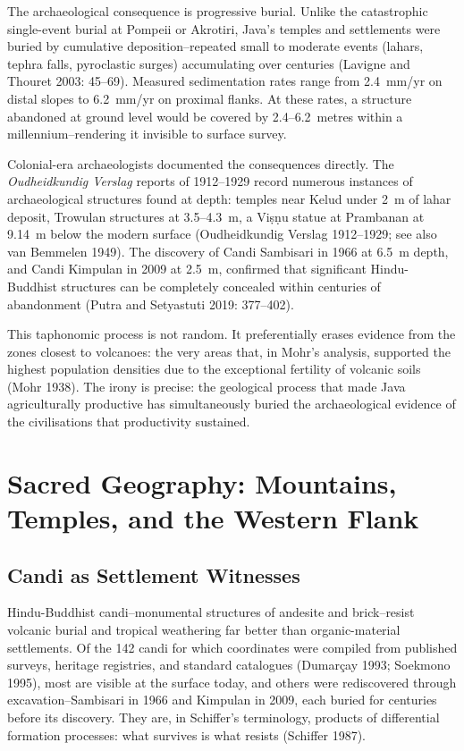\documentclass[12pt,a4paper]{article}
\begin{document}
The archaeological consequence is progressive burial.
Unlike the catastrophic single-event burial at Pompeii or Akrotiri, Java's temples and settlements were buried by cumulative deposition--repeated small to moderate events (lahars, tephra falls, pyroclastic surges) accumulating over centuries (Lavigne and Thouret 2003: 45--69).
Measured sedimentation rates range from 2.4~mm/yr on distal slopes to 6.2~mm/yr on proximal flanks.
At these rates, a structure abandoned at ground level would be covered by 2.4--6.2~metres within a millennium--rendering it invisible to surface survey.

Colonial-era archaeologists documented the consequences directly.
The \emph{Oudheidkundig Verslag} reports of 1912--1929 record numerous instances of archaeological structures found at depth: temples near Kelud under 2~m of lahar deposit, Trowulan structures at 3.5--4.3~m, a Vi\d{s}\d{n}u statue at Prambanan at 9.14~m below the modern surface (Oudheidkundig Verslag 1912--1929; see also van Bemmelen 1949).
The discovery of Candi Sambisari in 1966 at 6.5~m depth, and Candi Kimpulan in 2009 at 2.5~m, confirmed that significant Hindu-Buddhist structures can be completely concealed within centuries of abandonment (Putra and Setyastuti 2019: 377--402).

This taphonomic process is not random.
It preferentially erases evidence from the zones closest to volcanoes: the very areas that, in Mohr's analysis, supported the highest population densities due to the exceptional fertility of volcanic soils (Mohr 1938).
The irony is precise: the geological process that made Java agriculturally productive has simultaneously buried the archaeological evidence of the civilisations that productivity sustained.


\section{Sacred Geography: Mountains, Temples, and the Western Flank}

\subsection{Candi as Settlement Witnesses}

Hindu-Buddhist candi--monumental structures of andesite and brick--resist volcanic burial and tropical weathering far better than organic-material settlements.
Of the 142 candi for which coordinates were compiled from published surveys, heritage registries, and standard catalogues (Dumar\c{c}ay 1993; Soekmono 1995), most are visible at the surface today, and others were rediscovered through excavation--Sambisari in 1966 and Kimpulan in 2009, each buried for centuries before its discovery.
They are, in Schiffer's terminology, products of differential formation processes: what survives is what resists (Schiffer 1987).
\end{document}
